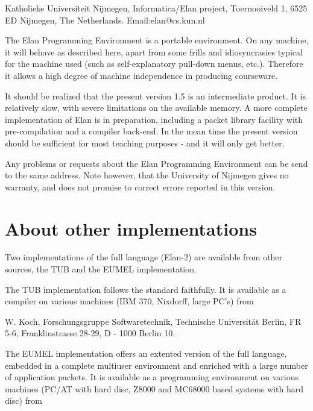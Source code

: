 \begin{literal}
Katholieke Universiteit Nijmegen,
Informatica/Elan project,
Toernooiveld 1,
6525 ED Nijmegen, The Netherlands.
Email:elan@cs.kun.nl
\end{literal}

\noindent
The Elan Programming Environment is a portable environment. On
any machine, it will behave as described here, apart from some
frills and idiosyncrasies typical for the machine used (such
as self-explanatory pull-down menus, etc.). Therefore it allows
a high degree of machine independence in producing courseware.

It should be realized that the present version 1.5 is an intermediate
product. It is relatively slow, with severe limitations on the
available memory. A more complete implementation of Elan is in
preparation, including a packet library facility with pre-compilation
and a compiler back-end. In the mean time the present version
should be sufficient for most teaching purposes - and it will
only get better.

Any problems or requests about the Elan Programming Environment
can be send to the same address. Note however, that the
University of Nijmegen gives no warranty, and does not promise
to correct errors reported in this version.

\section*{About other implementations}

Two implementations of the full language (Elan-2) are available
from other sources, the TUB and the EUMEL implementation.

The TUB implementation follows the standard faithfully.
It is available as a compiler on various machines
(IBM 370, Nixdorff, large PC's) from

\begin{literal}
W. Koch,
Forschungsgruppe Softwaretechnik,
Technische Universit\"{a}t Berlin, FR 5-6,
Franklinstrasse 28-29,
D - 1000 Berlin 10.
\end{literal}

\noindent
The EUMEL implementation offers an extented version of the full language,
embedded in a complete multiuser environment and
enriched with a large number of application packets.
It is available as a programming environment
on various machines (PC/AT with hard disc, Z8000 and MC68000 based
systems with hard disc) from

